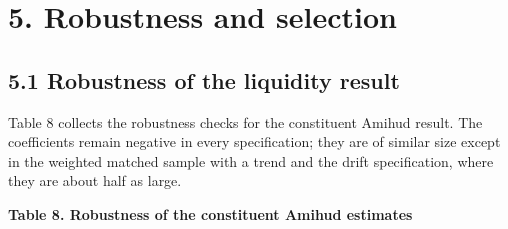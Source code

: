 \documentclass[review,authoryear,12pt]{elsarticle}
\begin{document}
\hypertarget{robustness-and-selection}{%
\section*{5. Robustness and selection}}

\hypertarget{robustness-of-the-liquidity-result}{%
\subsection*{5.1 Robustness of the liquidity
result}}

Table 8 collects the robustness checks for the constituent Amihud
result. The coefficients remain negative in every specification; they
are of similar size except in the weighted matched sample with a trend
and the drift specification, where they are about half as large.

\textbf{Table 8. Robustness of the constituent Amihud estimates}
\end{document}
